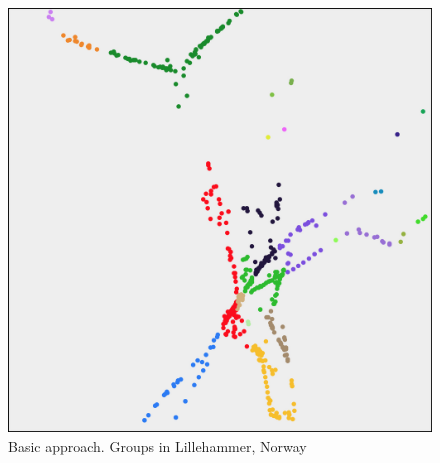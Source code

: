 \begin{figure}[H]
	\center
	\includegraphics[scale=0.34]{Images/computations/BASICTynset.jpg}
	\caption{Basic approach. Groups in Lillehammer, Norway}
	\label{fig:basic_tynset}
\end{figure}






%

